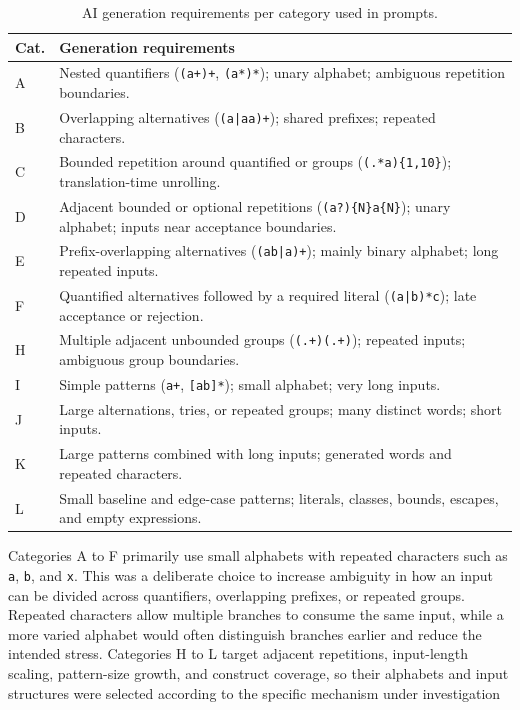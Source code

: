 \begin{table}[H]
\centering
\small
\begin{tabular*}{\textwidth}{@{\extracolsep{\fill}} l p{15cm}}
\hline
Cat. & Generation requirements \\
\hline
A & Nested quantifiers (\texttt{(a+)+}, \texttt{(a*)*});
    unary alphabet; ambiguous repetition boundaries. \\[3pt]
B & Overlapping alternatives (\texttt{(a|aa)+});
    shared prefixes; repeated characters. \\[3pt]
C & Bounded repetition around quantified or groups
    (\texttt{(.*a)\{1,10\}}); translation-time unrolling. \\[3pt]
D & Adjacent bounded or optional repetitions
    (\texttt{(a?)\{N\}a\{N\}}); unary alphabet;
    inputs near acceptance boundaries. \\[3pt]
E & Prefix-overlapping alternatives (\texttt{(ab|a)+});
    mainly binary alphabet; long repeated inputs. \\[3pt]
F & Quantified alternatives followed by a required literal
    (\texttt{(a|b)*c}); late acceptance or rejection. \\[3pt]
H & Multiple adjacent unbounded groups
    (\texttt{(.+)(.+)}); repeated inputs;
    ambiguous group boundaries. \\[3pt]
I & Simple patterns (\texttt{a+}, \texttt{[ab]*});
    small alphabet; very long inputs. \\[3pt]
J & Large alternations, tries, or repeated groups;
    many distinct words; short inputs. \\[3pt]
K & Large patterns combined with long inputs;
    generated words and repeated characters. \\[3pt]
L & Small baseline and edge-case patterns;
    literals, classes, bounds, escapes, and empty expressions. \\
\hline
\end{tabular*}
\caption{AI generation requirements per category used in prompts.}
\label{tab:patho-prompts}
\end{table}

Categories A to F primarily use small alphabets
with repeated characters such as \texttt{a}, \texttt{b}, and \texttt{x}. 
This was a deliberate choice to increase
ambiguity in how an input can be divided across quantifiers,
overlapping prefixes, or repeated groups. 
Repeated characters allow multiple branches to consume the same input,
while a more varied alphabet would often distinguish branches earlier
and reduce the intended stress.
Categories H to L target adjacent repetitions, input-length scaling,
pattern-size growth, and construct coverage,
so their alphabets and input structures were selected according to the
specific mechanism under investigation

